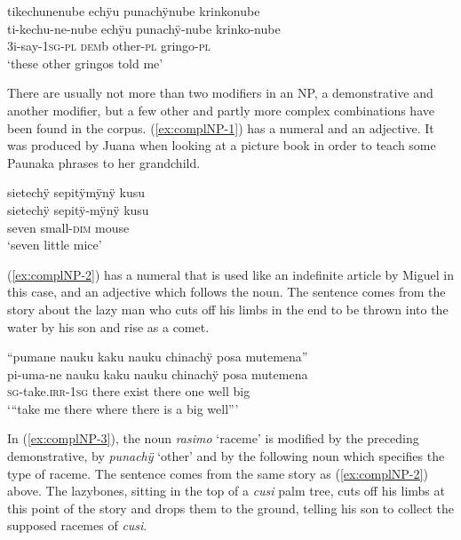 {\ea\label{ex:double-pl}
\begingl
\glpreamble tikechunenube echÿu punachÿnube krinkonube\\
\gla ti-kechu-ne-nube echÿu punachÿ-nube krinko-nube\\
\glb 3i-say-1\textsc{sg}-\textsc{pl} \textsc{dem}b other-\textsc{pl} gringo-\textsc{pl}\\
\glft ‘these other gringos told me’
\endgl
\trailingcitation{[mqx-p110826l.381]}
\xe{}


There are usually not more than two modifiers in an NP, a demonstrative and another modifier, but a few other and partly more complex combinations have been found in the corpus. (\ref{ex:complNP-1}) has a numeral and an adjective. It was produced by Juana when looking at a picture book in order to teach some Paunaka phrases to her grandchild.

\ea\label{ex:complNP-1}
\begingl
\glpreamble sietechÿ sepitÿmÿnÿ kusu\\
\gla sietechÿ sepitÿ-mÿnÿ kusu\\
\glb seven small-\textsc{dim} mouse\\
\glft ‘seven little mice’
\endgl
\trailingcitation{[jxx-e081025s.050]}
\xe


(\ref{ex:complNP-2}) has a numeral that is used like an indefinite article by Miguel in this case, and an adjective which follows the noun. The sentence comes from the story about the lazy man who cuts off his limbs in the end to be thrown into the water by his son and rise as a comet.

\ea\label{ex:complNP-2}
\begingl
\glpreamble “pumane nauku kaku nauku chinachÿ posa mutemena”\\
\gla pi-uma-ne nauku kaku nauku chinachÿ posa mutemena\\
\textsc{sg}-take.\textsc{irr}-1\textsc{sg} there exist there one well big\\
\glft ‘“take me there where there is a big well”’
\endgl
\trailingcitation{[mox-n110920l.121]}
\xe

In (\ref{ex:complNP-3}), the  noun \textit{rasimo} ‘raceme’ is modified by the preceding demonstrative, by \textit{punachÿ} ‘other’ and by the following noun which specifies the type of raceme. The sentence comes from the same story as (\ref{ex:complNP-2}) above. The lazybones, sitting in the top of a \textit{cusi} palm tree, cuts off his limbs at this point of the story and drops them to the ground, telling his son to collect the supposed racemes of \textit{cusi}.

}
